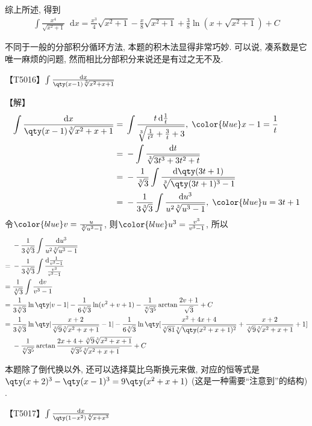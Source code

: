 \documentclass{ctexbook}
\newcommand*{\dif}{\mathop{}\!\mathrm{d}}
\begin{document}
{综上所述, 得到
\begin{align*}
\int\frac{x^{4}}{\sqrt{x^{2}+1}}\dif{x}=\frac{x^{3}}{4}\sqrt{x^{2}+1}-\frac{x}{8}\sqrt{x^{2}+1}+\frac{3}{8}\ln(x+\sqrt{x^{2}+1})+C
\end{align*}\par
{\kaishu 不同于一般的分部积分循环方法, 本题的积木法显得非常巧妙. 可以说, 凑系数是它唯一麻烦的问题, 然而相比分部积分来说还是有过之无不及. \par}
【T5016】$\int\frac{\dif{x}}{\qty(x-1)\sqrt[3]{x^{2}+x+1}}$\par
【解】
\begin{align*}
\int\frac{\dif{x}}{\qty(x-1)\sqrt[3]{x^{2}+x+1}}={}&\int\frac{t\dif{\frac{1}{t}}}{\sqrt[3]{\frac{1}{t^{2}}+\frac{3}{t}+3}},\;{\color{blue}x-1=\frac{1}{t}}\\
={}&-\int\frac{\dif{t}}{\sqrt[3]{3t^{3}+3t^{2}+t}}\\
={}&-\frac{1}{\sqrt[3]{3}}\int\frac{\dif{\qty(3t+1)}}{\sqrt[3]{\qty(3t+1)^{3}-1}}\\
={}&-\frac{1}{3\sqrt[3]{3}}\int\frac{\dif{u^{3}}}{u^{2}\sqrt[3]{u^{3}-1}},\;{\color{blue}u=3t+1}
\end{align*}
令$\color{blue}v=\frac{u}{\sqrt[3]{u^{3}-1}}$, 则$\color{blue}u^{3}=\frac{v^{3}}{v^{3}-1}$, 所以
\begin{align*}
{}&-\frac{1}{3\sqrt[3]{3}}\int\frac{\dif{u^{3}}}{u^{2}\sqrt[3]{u^{3}-1}}\\
={}&-\frac{1}{3\sqrt[3]{3}}\int\frac{\dif{\frac{1}{v^{3}-1}}}{\frac{v^{2}}{v^{3}-1}}\\
={}&\frac{1}{\sqrt[3]{3}}\int\frac{\dif{v}}{v^{3}-1}\\
={}&\frac{1}{3\sqrt[3]{3}}\ln\qty|v-1|-\frac{1}{6\sqrt[3]{3}}\ln(v^{2}+v+1)-\frac{1}{\sqrt[6]{3^{5}}}\arctan{\frac{2v+1}{\sqrt{3}}}+C\\
={}&\frac{1}{3\sqrt[3]{3}}\ln\qty|\frac{x+2}{\sqrt[3]{9}\sqrt[3]{x^{2}+x+1}}-1|-\frac{1}{6\sqrt[3]{3}}\ln\qty[\frac{x^{2}+4x+4}{\sqrt[3]{81}\sqrt[3]{\qty(x^{2}+x+1)^{2}}}+\frac{x+2}{\sqrt[3]{9}\sqrt[3]{x^{2}+x+1}}+1]\\
{}&-\frac{1}{\sqrt[6]{3^{5}}}\arctan{\frac{2x+4+\sqrt[3]{9}\sqrt[3]{x^{2}+x+1}}{\sqrt[6]{3^{5}}\sqrt[3]{x^{2}+x+1}}}+C
\end{align*}\par
{\kaishu 本题除了倒代换以外, 还可以选择莫比乌斯换元来做, 对应的恒等式是$\qty(x+2)^{3}-\qty(x-1)^{3}=9\qty(x^{2}+x+1)$ (这是一种需要“注意到”的结构) . \par}
【T5017】$\int\frac{\dif{x}}{\qty(1-x^{2})\sqrt[4]{x+x^{3}}}$\par
}
\end{document}
